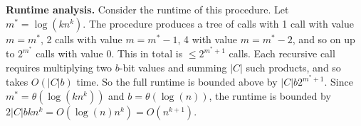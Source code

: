 \documentclass{article}
\renewcommand{\P}{\mathbf{P}}
\def \BPL{{\mathbf{BPL}}}
\begin{document}
\medskip
\noindent \textbf{Runtime analysis.}
Consider the runtime of this procedure.
Let $m^* = \log(kn^k)$.
The procedure produces a tree of calls with 1 call with value $m = m^*$, 2 calls with value $m = m^*-1$, 4 with value $m = m^*-2$, and so on up to $2^{m^*}$ calls with value 0.
This in total is $\leq 2^{m^*+1}$ calls.
Each recursive call requires multiplying two $b$-bit values and summing $|C|$ such products, and so takes $O(|C|b)$ time.
So the full runtime is bounded above by $|C|b2^{m^*+1}$.
Since $m^* = \theta(\log (k n^k))$ and $b = \theta(\log(n))$, the runtime is bounded by $2|C|bk n^k = O(\log(n)n^k) = O(n^{k+1})$.

















\end{document}
